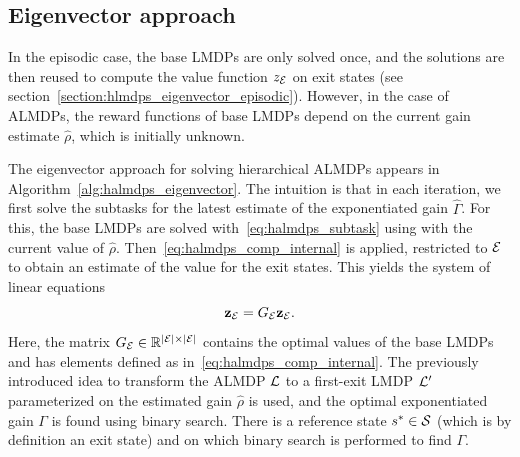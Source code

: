 \subsection{Eigenvector approach}

In the episodic case, the base LMDPs are only solved once, and the solutions are then reused to compute the value function $z_{\mathcal{E}}$ on exit states (see section~\ref{section:hlmdps_eigenvector_episodic}). However, in the case of ALMDPs, the reward functions of base LMDPs depend on the current gain estimate $\widehat\rho$, which is initially unknown. 



The eigenvector approach for solving hierarchical ALMDPs appears in Algorithm~\ref{alg:halmdps_eigenvector}. The intuition is that in each iteration, we first solve the subtasks for the latest estimate of the exponentiated gain $\widehat\Gamma$. For this, the base LMDPs are solved with~\eqref{eq:halmdps_subtask} using with the current value of $\widehat\rho$. Then~\eqref{eq:halmdps_comp_internal} is applied, restricted to $\mathcal{E}$ to obtain an estimate of the value for the exit states. This yields the system of linear equations
\begin{equation}
    {\bf z_{\mathcal{E}}} = G_{\mathcal{E}} {\bf z_{\mathcal{E}}}.\label{eq:halmdps_eigenvector}
\end{equation}
Here, the matrix $G_{\mathcal{E}}\in\mathbb{R}^{\lvert\mathcal{E}\rvert\times \lvert\mathcal{E}\rvert}$ contains the optimal values of the base LMDPs and has elements defined as in~\eqref{eq:halmdps_comp_internal}. The previously introduced idea to transform the ALMDP $\mathcal{L}$ to a first-exit LMDP $\mathcal{L}'$ parameterized on the estimated gain $\widehat\rho$ is used, and the optimal exponentiated gain $\Gamma$ is found using binary search. There is a reference state $s^*\in\mathcal{S}$ (which is by definition an exit state) and on which binary search is performed to find $\Gamma$.

